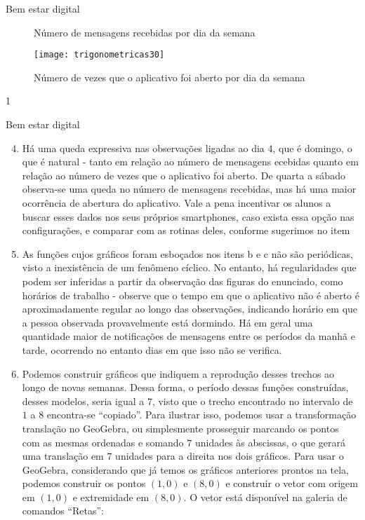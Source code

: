 \begin{answer}{Bem estar digital}
{\begin{enumerate}[left=7.5pt, wide]
\begin{multicols}{2}
\begin{figure}[H]
\caption{Número de mensagens
recebidas por dia da semana}
\label{}
\end{figure}
\begin{figure}[H]
\centering
\texttt{[image: trigonometricas30]}
\caption{Número de vezes que o
aplicativo foi aberto por dia da semana}
\label{}
\end{figure}
\end{multicols}
\end{enumerate}
}{1}
\end{answer}
\clearmargin
\marginpar{\vspace{.5em}}
\begin{answer}{Bem estar digital}
{
	\begin{enumerate}[left=7.5pt, wide]\setcounter{enumi}{3}
	\item Há uma queda expressiva nas observações ligadas ao dia 4, que é domingo, o que é natural - tanto em relação ao número de mensagens  ecebidas quanto em relação ao número de vezes que o aplicativo foi aberto. De quarta a sábado observa-se uma queda no número de mensagens recebidas, mas há uma maior ocorrência de abertura do aplicativo. Vale a pena incentivar os alunos a buscar esses dados nos seus próprios smartphones, caso exista essa opção nas configurações, e comparar com as rotinas deles, conforme sugerimos no item 

	\item As funções cujos gráficos foram esboçados nos itens b e c não são periódicas, visto a inexistência de um fenômeno cíclico. No entanto, há regularidades que podem ser inferidas a partir da observação das figuras do enunciado, como horários de trabalho - observe que o tempo em que o aplicativo não é aberto é aproximadamente regular ao longo das observações, indicando horário em que a pessoa observada provavelmente está dormindo. Há em geral uma quantidade maior de notificações de mensagens entre os períodos da manhã e tarde, ocorrendo no entanto dias em que isso não se verifica.
	\item Podemos construir gráficos que indiquem a reprodução desses trechos ao longo de novas semanas. Dessa forma, o período dessas funções construídas, desses modelos, seria igual a $7$, visto que o trecho encontrado no intervalo de $1$ a $8$ encontra-se “copiado”. Para ilustrar isso,  podemos usar a transformação translação no GeoGebra, ou simplesmente prosseguir marcando os pontos com as mesmas ordenadas e somando $7$ unidades às abscissas, o que gerará uma translação em $7$ unidades para a direita nos dois gráficos. Para usar o GeoGebra, considerando que já temos os gráficos anteriores prontos na tela, podemos construir os pontos $(1,0)$ e $(8,0)$ e construir o vetor com origem em $(1,0)$ e extremidade em $(8,0)$. O vetor está disponível na galeria de comandos “Retas”:


\end{enumerate}}
\end{answer}
